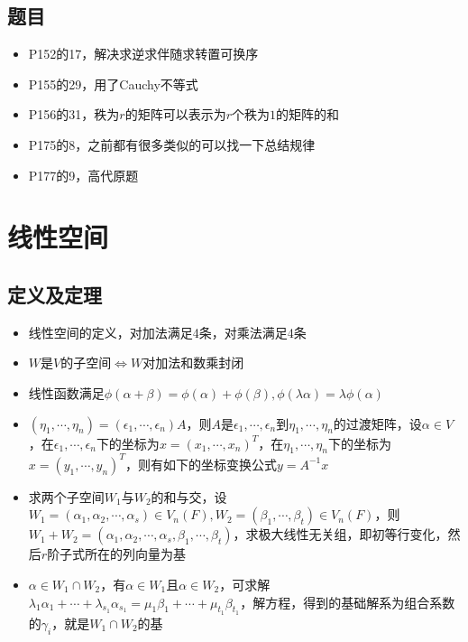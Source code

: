 \documentclass[UTF8]{ctexart}
\begin{document}
\subsection{题目}
\begin{itemize}
\item P152的17，解决求逆求伴随求转置可换序
\item P155的29，用了Cauchy不等式
\item P156的31，秩为$r$的矩阵可以表示为$r$个秩为$1$的矩阵的和
\item P175的8，之前都有很多类似的可以找一下总结规律
\item P177的9，高代原题
\end{itemize}


\section{线性空间}
\subsection{定义及定理}
\begin{itemize}
\item 线性空间的定义，对加法满足4条，对乘法满足4条

\item $W$是$V$的子空间$\Leftrightarrow W$对加法和数乘封闭

\item 线性函数满足$\phi(\alpha+\beta)=\phi(\alpha)+\phi(\beta),\phi(\lambda\alpha)=\lambda\phi(\alpha)$

\item $(\eta_1,\cdots,\eta_n)=(\epsilon_1,\cdots,\epsilon_n)A$，则$A$是$\epsilon_1,\cdots,\epsilon_n$到$\eta_1,\cdots,\eta_n$的过渡矩阵，设$\alpha\in V$，在$\epsilon_1,\cdots,\epsilon_n$下的坐标为$x=(x_1,\cdots,x_n)^T$，在$\eta_1,\cdots,\eta_n$下的坐标为$x=(y_1,\cdots,y_n)^T$，则有如下的坐标变换公式$y=A^{-1}x$

\item 求两个子空间$W_1$与$W_2$的和与交，设$W_1=(\alpha_1,\alpha_2,\cdots,\alpha_s)\in V_n(F),W_2=(\beta_1,\cdots,\beta_t)\in V_n(F)$，则$W_1+W_2=(\alpha_1,\alpha_2,\cdots,\alpha_s,\beta_1,\cdots,\beta_t)$，求极大线性无关组，即初等行变化，然后$r$阶子式所在的列向量为基

\item $\alpha\in W_1\cap W_2$，有$\alpha\in W_1$且$\alpha\in W_2$，可求解$\lambda_1\alpha_1+\cdots+\lambda_{s_1}\alpha_{s_1}=\mu_1\beta_1+\cdots+\mu_{t_1}\beta_{t_1}$，解方程，得到的基础解系为组合系数的${\gamma_i}$，就是$W_1\cap W_2$的基
\end{itemize}
\end{document}
